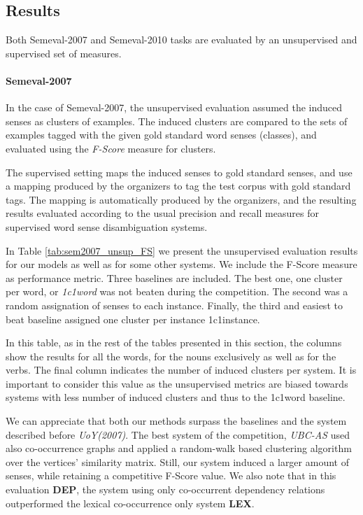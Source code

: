 \subsection{Results}
Both Semeval-2007 and Semeval-2010 tasks are evaluated by an unsupervised and supervised set of measures. 
\paragraph{Semeval-2007}
In the case of Semeval-2007, the unsupervised evaluation assumed the induced senses as clusters of examples. The induced clusters are compared to the sets of examples tagged with the given gold standard word senses (classes), and evaluated using the \textit{F-Score} measure for clusters. 
 
The supervised setting maps the induced senses to gold standard senses, and use a mapping produced by the organizers to tag the test corpus with gold standard tags. The mapping is
automatically produced by the organizers, and the resulting results evaluated according to the
usual precision and recall measures for supervised word sense disambiguation systems. 


In Table \ref{tab:sem2007_unsup_FS} we present the unsupervised evaluation results for our models as well as for some other systems. We include the F-Score measure as performance metric. Three baselines are included. The best one, one cluster per word, or \textit{1c1word} was not beaten during the competition. The second was a random assignation of senses to each instance. Finally, the third and easiest to beat baseline assigned one cluster per instance {1c1instance}. 

In this table, as in the rest of the tables presented in this section, the columns show the results for all the words, for the nouns exclusively as well as for the verbs. The final column indicates the number of induced clusters per system. It is important to consider this value as the unsupervised metrics are biased towards systems with less number of induced clusters and thus to the 1c1word baseline.

We can appreciate that both our methods surpass the baselines and the system described before \textit{UoY(2007)}. The best system of the competition, \textit{UBC-AS} used also co-occurrence graphs and applied a random-walk based clustering algorithm over the vertices' similarity matrix. Still, our system induced a larger amount of senses, while retaining a competitive F-Score value. We also note that in this evaluation \textbf{DEP}, the system using only co-occurrent dependency relations outperformed the lexical co-occurrence only system \textbf{LEX}.


